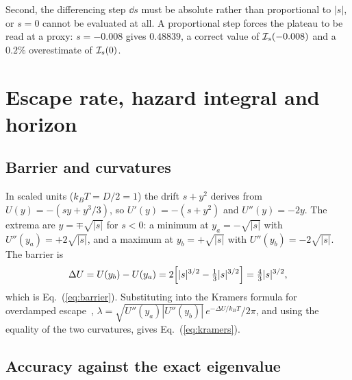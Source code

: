Second, the differencing step $\dd s$ must be absolute rather than proportional to $|s|$, or $s=0$ cannot be evaluated at all.  A proportional step forces the plateau to be read at a proxy: $s=-0.008$ gives $0.48839$, a correct value of $\mathcal{I}_s(-0.008)$ and a $0.2\%$ overestimate of $\mathcal{I}_s(0)$.

\section{\label{app:kramers}Escape rate, hazard integral and horizon}

\subsection{Barrier and curvatures}

In scaled units ($k_BT=D/2=1$) the drift $s+y^2$ derives from $U(y)=-(sy+y^3/3)$, so $U'(y)=-(s+y^2)$ and $U''(y)=-2y$.  The extrema are $y=\mp\sqrt{|s|}$ for $s<0$: a minimum at $y_a=-\sqrt{|s|}$ with $U''(y_a)=+2\sqrt{|s|}$, and a maximum at $y_b=+\sqrt{|s|}$ with $U''(y_b)=-2\sqrt{|s|}$.  The barrier is
\begin{equation}
\Delta U=U(y_b)-U(y_a)
=2\Bigl[|s|^{3/2}-\tfrac13|s|^{3/2}\Bigr]=\tfrac43|s|^{3/2},
\end{equation}
which is Eq.~(\ref{eq:barrier}).  Substituting into the Kramers formula for overdamped escape~\cite{Kramers1940,Hanggi1990},
$\lambda=\sqrt{U''(y_a)|U''(y_b)|}\,e^{-\Delta U/k_BT}/2\pi$, and using the equality of the two curvatures, gives Eq.~(\ref{eq:kramers}).

\subsection{Accuracy against the exact eigenvalue}

